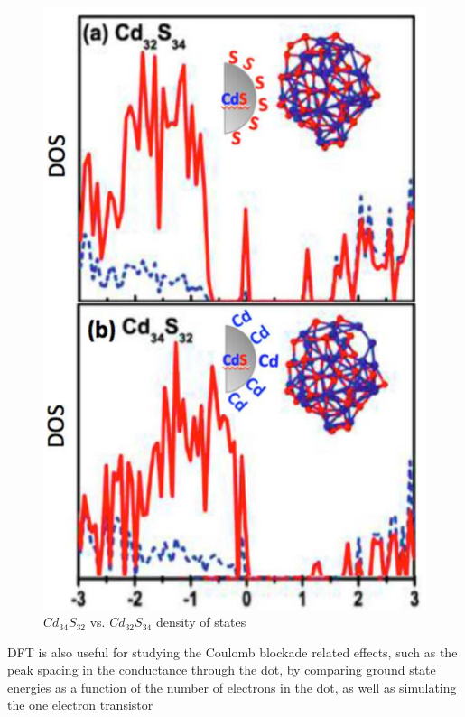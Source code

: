 \documentclass[twoside,11pt]{article}
\begin{document}
    \begin{figure}
        \centering
        \includegraphics[scale = 0.4]{Dos metallic vs nonmetalic.png}
        \caption{$Cd_{34}S_{32}$ vs. $Cd_{32}S_{34}$ density of states}
        \label{fig:DFT metallic vs nonmetalic}
    \end{figure}

    DFT is also useful for studying the Coulomb blockade related effects, such as the peak spacing in the conductance through the dot, by comparing ground state energies as a function of the number of electrons in the dot\cite{sDFT}, as well as simulating the one electron transistor
\end{document}
